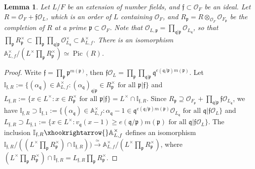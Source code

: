 \documentclass{amsart}
\numberwithin{equation}{subsection}
\numberwithin{theorem}{section}
\newtheorem{lemma}[theorem]{Lemma}
\theoremstyle{definition}
\theoremstyle{remark}
\newcommand{\bA}{\mathbb{A}}
\newcommand{\bI}{\mathbb{I}}
\newcommand{\cO}{\mathcal{O}}
\newcommand{\fp}{\mathfrak{p}}
\newcommand{\fq}{\mathfrak{q}}
\DeclareMathOperator{\Pic}{Pic}
\begin{document}
\begin{lemma} \label{lem:orderPicard}
    Let $L/F$ be an extension of number fields, and $\mathfrak{f}\subset \cO_F$ be an ideal. Let $R = \cO_F+\mathfrak{f}\cO_L$, which is an order of $L$ containing $\cO_F$, and $R_{\fp} = R\otimes_{\cO_F}\cO_{F_{\fp}} $ be the completion of $R$ at a prime $\fp \subset \cO_F$. Note that $\cO_{L, \fp} = \prod_{\fq | \fp} \cO_{L_{\fq}}$, so that $\prod_{\fp} R_{\fp}^\times \subset \prod_{\fp} \prod_{\fq|\fp} \cO_{L_{\fq}}^\times \subset \bA_{L,f}^\times$. There is an isomorphism $\bA_{L,f}^\times /(L^\times \prod_{\fp} R_{\fp}^\times ) \simeq \Pic(R)$. 
\end{lemma}
\begin{proof}
    Write $\mathfrak{f} = \prod_{\mathfrak{p}} \fp^{m(\fp)}$, then $\mathfrak{f}\cO_L = \prod_{\mathfrak{p}}\prod_{\mathfrak{q}|\mathfrak{p}} \fq^{e(\fq/\fp)m(\fp)}$. Let $\bI_{\mathfrak{f},R} := \{(\alpha_\fq)\in \bA_{L,f}^\times: (\alpha_\fq)_{\fq|\fp} \in R_{\fp}^\times \text{ for all } \fp | \mathfrak{f}\}$
and $L_{\mathfrak{f},R}:= \{x\in L^\times: x \in R_{\fp}^\times \text{ for all }\fp |\mathfrak{f}\} = L^\times \cap \bI_{\mathfrak{f},R}$. Since $R_{\fp} \supseteq \cO_{F_{\fp}}+\prod_{\fq|\fp}\mathfrak{f}\cO_{L_{\fq}}$, we have  $\bI_{\mathfrak{f},R} \supset \bI_{\mathfrak{f}, 1} := \{(\alpha_\fq)\in \bA_{L,f}^\times: \alpha_{\fq}-1\in \fq^{e(\fq/\fp)m(\fp)}\cO_{L_{\fq}}\text{ for all }\fq |\mathfrak{f}\cO_L\}$ and $L_{\mathfrak{f},R} \supset L_{\mathfrak{f}, 1} := \{x\in L^\times: v_{\fq}(x-1)\geq e(\fq/\fp)m(\fp)\text{ for all }\fq |\mathfrak{f}\cO_L\}$. The inclusion $\bI_{\mathfrak{f},R} \xhookrightarrow{} \bA_{L,f}^\times$ defines an isomorphism $\bI_{\mathfrak{f},R} /((L^\times \prod_{\fp} R_{\fp}^\times )\cap \bI_{\mathfrak{f},R}))\xrightarrow{\simeq} \bA_{L,f}^\times/(L^\times \prod_{\fp} R_{\fp}^\times )$, 
    where $(L^\times \prod_{\fp} R_{\fp}^\times )\cap \bI_{\mathfrak{f},R} = L_{\mathfrak{f},R}\prod_{\fp}R_{\fp}^\times$. 
    

\end{proof}
\end{document}
